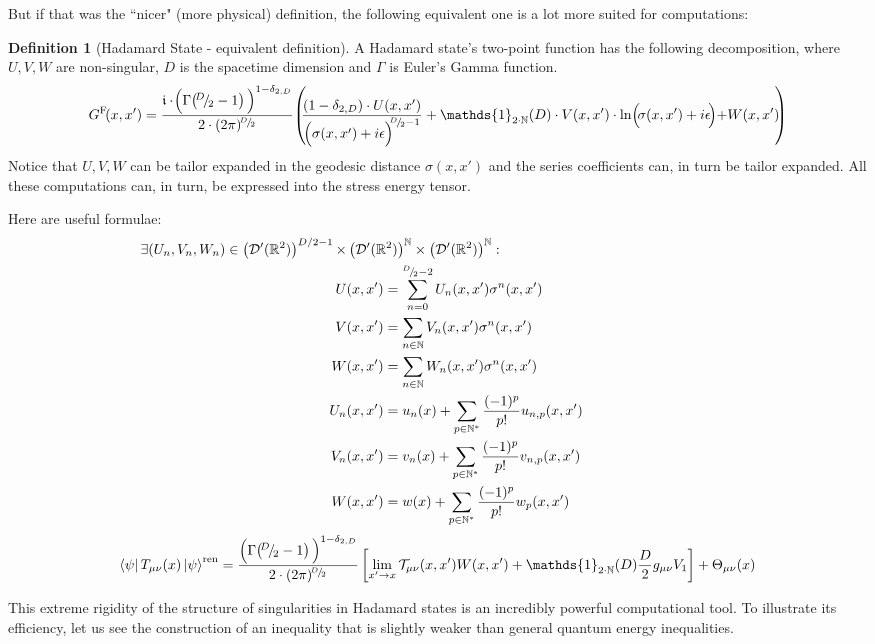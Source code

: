 \documentclass[a4paper,11pt]{article}
\numberwithin{equation}{section}
\theoremstyle{definition}
\newtheorem{definition}{Definition}
\begin{document}
But if that was the ``nicer" (more physical) definition, the following equivalent one is a lot more suited for computations:
\begin{definition}[Hadamard State - equivalent definition]
    A Hadamard state's two-point function has the following decomposition, where $U,V,W$ are non-singular, $D$ is the spacetime dimension and $\Gamma$ is Euler's Gamma function.
    \begin{equation*}
G^\mathrm{F}\!(x,x')=\frac{\mathfrak{i}\cdot\!\Bigl(\Gamma\!\left(\!^D\!/_{\!2}-1\right)\Bigl)^{1-\delta_{2,D}}}{2\cdot(2\pi)^{\!^D\!/_{\!2}}}\!\left(\!\!\frac{(1-\delta_{2,D})\cdot U(x,x')}{\Bigl(\sigma(x,x')+i\epsilon\Bigl)^{\!\!^D\!/_{\!2}-1}}+\mathds{1}_{2\cdot \mathbb{N}}(D) \cdot V(x,x')\cdot\mathrm{ln}\Bigl(\!\sigma(x,x')+i\epsilon\!\Bigl)+W(x,x')\!\!\right)
\end{equation*}
Notice that $U,V,W$ can be tailor expanded in the geodesic distance $\sigma(x,x')$ and the series coefficients can, in turn be tailor expanded. All these computations can, in turn, be expressed into the stress energy tensor.

Here are useful formulae:
\begin{align}
    \exists (U_n, V_n, W_n) \in \left(\mathcal{D}'(\mathbb{R}^2)\right)^{D/2-1}\times & \left(\mathcal{D}'(\mathbb{R}^2)\right)^\mathbb{N}\times\left(\mathcal{D}'(\mathbb{R}^2)\right)^\mathbb{N}:\notag\\
    U&(x,x')=\sum_{n=0}^{^D\!/_{\!2}-2}U_n(x,x')\sigma^n(x,x')\notag\\
    V&(x,x')=\sum_{n\in\mathbb{N}}V_n(x,x')\sigma^n(x,x')\notag\\
    W&(x,x')=\sum_{n\in\mathbb{N}}W_n(x,x')\sigma^n(x,x')\notag\\
    U_n&(x,x')=u_n(x)+\sum_{p\in\mathbb{N}^*}\frac{(-1)^p}{p!}u_{n,p}(x,x')\\
    V_n&(x,x')=v_n(x)+\sum_{p\in\mathbb{N}^*}\frac{(-1)^p}{p!}v_{n,p}(x,x')
    \notag\quad\quad\quad\quad\quad\quad\quad\quad\quad\quad\quad\\
    W&(x,x')=w(x)+\sum_{p\in\mathbb{N}^*}\frac{(-1)^p}{p!}w_{p}(x,x')\notag
    \end{align}
    $$\bra{\psi}T_{\mu\nu}(x)\ket{\psi}^\mathrm{ren} = \frac{\Bigl(\Gamma\!\left(\!^D\!/_{\!2}-1\right)\Bigl)^{1-\delta_{2,D}}}{2\cdot(2\pi)^{\!^D\!/_{\!2}}}\left[\lim_{x'\to x}\mathcal{T}_{\mu\nu}(x,x')W(x,x')+\mathds{1}_{2\cdot \mathbb{N}}(D)\frac{D}{2}g_{\mu\nu}V_1\right]+\Theta_{\mu\nu}(x)$$

\end{definition}
This extreme rigidity of the structure of singularities in Hadamard states is an incredibly powerful computational tool. To illustrate its efficiency, let us see the construction of an inequality that is slightly weaker than general quantum energy inequalities.
\end{document}
